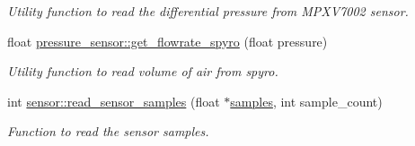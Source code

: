 \begin{DoxyCompactItemize}
\begin{DoxyCompactList}\small\item\em Utility function to read the differential pressure from M\+P\+X\+V7002 sensor. \end{DoxyCompactList}\item 
float \hyperlink{group___ventilator_module_ga4a650b2c4cb1b55f8be3a4c129d4f12a}{pressure\+\_\+sensor\+::get\+\_\+flowrate\+\_\+spyro} (float pressure)
\begin{DoxyCompactList}\small\item\em Utility function to read volume of air from spyro. \end{DoxyCompactList}\item 
int \hyperlink{group___ventilator_module_gaa646dcf1c12ed21dd027a49721e27b04}{sensor\+::read\+\_\+sensor\+\_\+samples} (float $\ast$\hyperlink{classsensor_a795220a22d60a8babb9383b002342220}{samples}, int sample\+\_\+count)
\begin{DoxyCompactList}\small\item\em Function to read the sensor samples. \end{DoxyCompactList}\end{DoxyCompactItemize}
